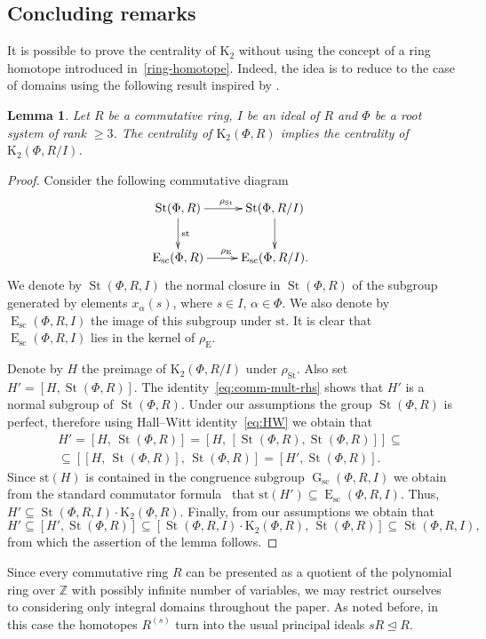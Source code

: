 \documentclass[oneside, 11pt]{amsart}
\numberwithin{equation}{section}
\newtheorem{lemma}{Lemma} \numberwithin{lemma}{section}
\theoremstyle{definition}
\theoremstyle{remark}
\DeclareMathOperator\St{St}
\DeclareMathOperator\GG{G}
\DeclareMathOperator\E{E}
\newcommand{\ZZ}{\mathbb{Z}}
\begin{document}
 \subsection{Concluding remarks} \label{no-homotopes}
 It is possible to prove the centrality of $\mathrm{K}_2$ without using the concept of a ring homotope introduced in~\cref{ring-homotope}.
 Indeed, the idea is to reduce to the case of domains using the following result inspired by \cite[Lemma~5.3]{St99}.
 \begin{lemma} Let $R$ be a commutative ring, $I$ be an ideal of $R$ and $\Phi$ be a root system of rank $\geq 3$.
 The centrality of $\mathrm{K}_2(\Phi, R)$ implies the centrality of $\mathrm K_2(\Phi, R/I)$. \end{lemma}
 \begin{proof} Consider the following commutative diagram
 \[\xymatrix{\St(\Phi, R) \ar[r]^{\rho_\mathrm{St}} \ar[d]^{\mathrm{st}} & \St(\Phi, R/I) \ar[d] \\ \mathrm{E}_{\mathrm{sc}}(\Phi,R) \ar[r]^{\rho_\mathrm{E}} & \mathrm{E}_{\mathrm{sc}}(\Phi, R/I).}\]
 We denote by $\St(\Phi, R, I)$ the normal closure in $\St(\Phi, R)$ of the subgroup generated by elements $x_\alpha(s)$, where $s\in I$, $\alpha\in\Phi$. We also denote by $\E_{\mathrm{sc}}(\Phi, R, I)$ the image of this subgroup under $\mathrm{st}$.
 It is clear that $\E_\mathrm{sc}(\Phi, R, I)$ lies in the kernel of $\rho_\mathrm{E}$.
 
 Denote by $H$ the preimage of $\mathrm{K}_2(\Phi, R/I)$ under $\rho_\mathrm{St}$. Also set $H'=[H, \St(\Phi, R)]$. The identity~\eqref{eq:comm-mult-rhs} shows that $H'$ is a normal subgroup of $\St(\Phi, R)$. Under our assumptions the group $\St(\Phi, R)$ is perfect, therefore using Hall--Witt identity~\eqref{eq:HW} we obtain that
 \begin{multline}\nonumber H' = [H,\, \St(\Phi, R)] = \left[H,\, [\St(\Phi, R), \St(\Phi, R)]\right] \subseteq \\ \subseteq \left[[H,\, \St(\Phi, R)],\, \St(\Phi, R)\right] = [H', \St(\Phi, R)]. \end{multline} 
 Since $\mathrm{st}(H)$ is contained in the congruence subgroup $\GG_\mathrm{sc}(\Phi, R, I)$ we obtain from the standard commutator formula~\cite{Va86} that $\mathrm{st}(H')\subseteq\E_\mathrm{sc}(\Phi, R, I)$. Thus, $H'\subseteq \St(\Phi, R, I) \cdot \mathrm{K}_2(\Phi, R)$. Finally, from our assumptions we obtain that
 \[H' \subseteq [H', \St(\Phi, R)] \subseteq [\St(\Phi, R, I)\cdot \mathrm{K}_2(\Phi, R),\, \St(\Phi, R)] \subseteq \St(\Phi,R,I),\] from which the assertion of the lemma follows.
 \end{proof}
 Since every commutative ring $R$ can be presented as a quotient of the polynomial ring over $\ZZ$ with possibly infinite number of variables,
  we may restrict ourselves to considering only integral domains throughout the paper.
 As noted before, in this case the homotopes $R^{(s)}$ turn into the usual principal ideals $sR \trianglelefteq R$.
 
\printbibliography
\end{document}
